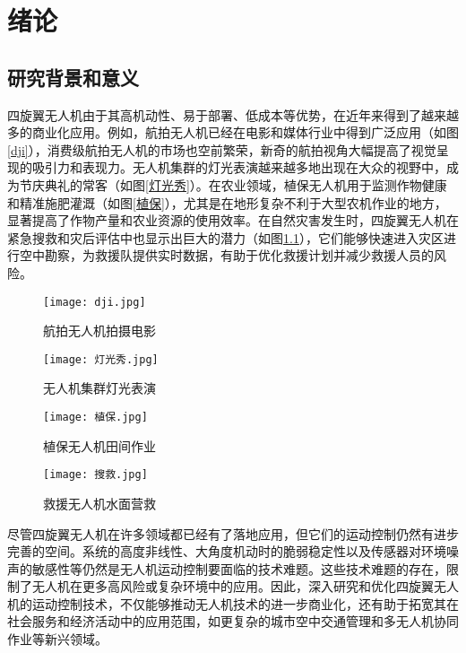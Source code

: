 
\chapter{绪论}
\section{研究背景和意义}

四旋翼无人机由于其高机动性、易于部署、低成本等优势，在近年来得到了越来越多的商业化应用。例如，航拍无人机已经在电影和媒体行业中得到广泛应用（如图\ref{dji}），消费级航拍无人机的市场也空前繁荣，新奇的航拍视角大幅提高了视觉呈现的吸引力和表现力。无人机集群的灯光表演越来越多地出现在大众的视野中，成为节庆典礼的常客（如图\ref{灯光秀}）。在农业领域，植保无人机用于监测作物健康和精准施肥灌溉（如图\ref{植保}），尤其是在地形复杂不利于大型农机作业的地方，显著提高了作物产量和农业资源的使用效率。在自然灾害发生时，四旋翼无人机在紧急搜救和灾后评估中也显示出巨大的潜力（如图\ref{救援}），它们能够快速进入灾区进行空中勘察，为救援队提供实时数据，有助于优化救援计划并减少救援人员的风险。

\begin{figure}[htb]
    \centering
    \begin{minipage}[b]{0.49\linewidth}
        \texttt{[image: dji.jpg]}
        \caption{航拍无人机拍摄电影}
        \label{dji}
    \end{minipage}
    \hfill %
    \begin{minipage}[b]{0.49\linewidth}
        \texttt{[image: 灯光秀.jpg]}
        \caption{无人机集群灯光表演}
        \label{灯光秀}
    \end{minipage}


    \begin{minipage}[b]{0.49\linewidth}
        \texttt{[image: 植保.jpg]}
        \caption{植保无人机田间作业}
        \label{植保}
    \end{minipage}
    \hfill
    \begin{minipage}[b]{0.49\linewidth}
        \texttt{[image: 搜救.jpg]}
        \caption{救援无人机水面营救}
        \label{救援}
    \end{minipage}
\end{figure}

尽管四旋翼无人机在许多领域都已经有了落地应用，但它们的运动控制仍然有进步完善的空间。系统的高度非线性、大角度机动时的脆弱稳定性以及传感器对环境噪声的敏感性等仍然是无人机运动控制要面临的技术难题。这些技术难题的存在，限制了无人机在更多高风险或复杂环境中的应用。因此，深入研究和优化四旋翼无人机的运动控制技术，不仅能够推动无人机技术的进一步商业化，还有助于拓宽其在社会服务和经济活动中的应用范围，如更复杂的城市空中交通管理和多无人机协同作业等新兴领域。

